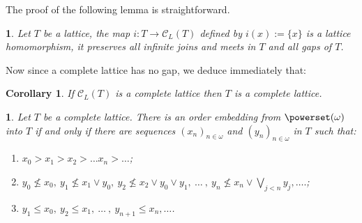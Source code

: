 \documentclass[12pt]{amsart}
\newtheorem{corollary}[definition]{{\bf Corollary}}
\newtheorem{lemma}[definition]{\noindent {\bf Lemma}}
\begin{document}
The proof of the following lemma is straightforward. 

\begin{lemma} \label {lem:wood2}
Let $T$ be a lattice, the map $i:T\rightarrow \mathcal{C}_{ L}(T)$
defined by $i(x):=\{x\}$ is a lattice homomorphism, it preserves all
infinite joins and meets in $T$ and all gaps of $T$.
\end{lemma}

Now since a complete lattice has no gap, we deduce immediately that:

\begin{corollary}\label{cor:wood2}
If $\mathcal{C}_{ L}(T)$ is a complete lattice then $T$ is a complete
lattice.
\end{corollary}

\begin{lemma}\label{lem:embeddingtest}
Let $T$ be a complete lattice. There is an order embedding from
$\powerset(\omega)$ into $T$ if and only if there are sequences
$(x_n)_{n \in \omega}$ and $(y_n)_{n \in \omega }$ in $T$ such that:

\begin{enumerate}[{(i)}]
\item  $x_0>x_1> x_2>  \dots x_n> \dots  $;\\[-.2cm]
\item  $y_0\not \leq x_0, \ y_1\not \leq x_1\vee y_0, \ y_2\not \leq x_2\vee y_0\vee y_1, \  \dots \ , \ y_n\not\leq x_n\vee \bigvee_{j<n}y_j, \dots.$;\\[-.2cm]
\item $y_1\leq x_0, \ y_2\leq x_1, \ \dots \ , \ y_{n+1}\leq x_n, \dots$.
\end{enumerate}
\end{lemma}
\end{document}
